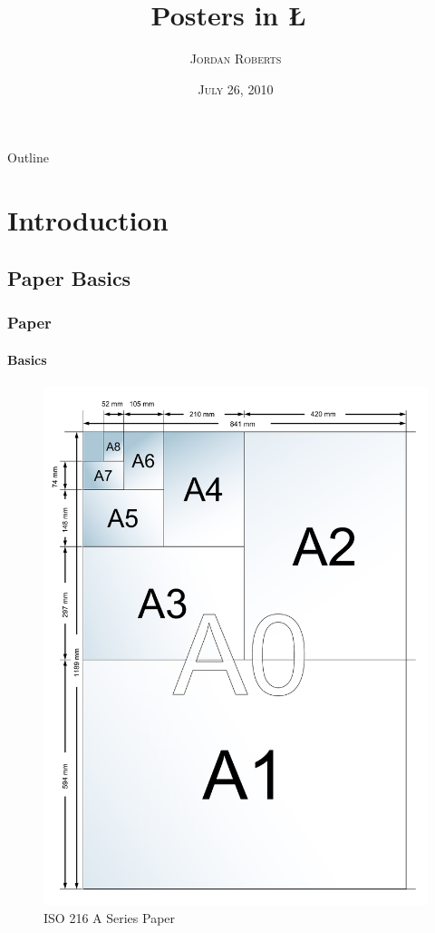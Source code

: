 \documentclass[11pt]{beamer}
\title{Posters in \L\ }
\author[Jordan Roberts]{\textsc{Jordan Roberts}}
\institute{\textsc{Department of Mechanical Engineering\\Auburn University}}
\date[7/26/2010]{\textsc{\scriptsize{July 26, 2010}}}
\begin{document}

\maketitle
\begin{frame}[shrink]{Outline}{}
{%
\tableofcontents[sections={1-5}]
}
\end{frame}

\section{Introduction}
\subsection{Paper Basics}
\begin{frame}
\frametitle{Paper}\framesubtitle{Basics}
	\centering
	\begin{figure}[htbp]
		\includegraphics[scale=.15]{Asizeillustration.pdf}
		\caption{ISO 216 A Series Paper}
		\label{fig:apaper}
	\end{figure}
\end{frame}
\end{document}
